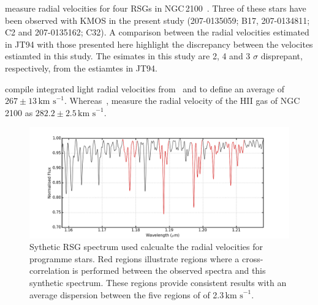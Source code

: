 \documentclass[useAMS,usenatbib]{mn2e}
\def\kms{$\mbox{km s}^{-1}$}
\begin{document}
\cite{1994A&A...282..717J} measure radial velocities for four RSGs in NGC\,2100~\citep[B17, C2, C32 and C34 using the nomenclature of][]{1974A&AS...15..261R}.
Three of these stars have been observed with KMOS in the present study (207-0135059; B17, 207-0134811; C2 and 207-0135162; C32).
A comparison between the radial velocities estimated in JT94 with those presented here highlight the discrepancy between the velocites estiamted in this study.
The esimates in this study are 2, 4 and 3 $\sigma$ disprepant, respectively, from the estiamtes in JT94.



\cite{1983ApJ...272..488F} compile integrated light radial velocities from~\cite{1972MNRAS.159..445A} and \cite{1970PhD...........F} to define an average of $267\pm13\,$\kms.
Whereas~\cite{1971ApJ...169..271S}, measure the radial velocity of the HII gas of NGC\,2100 as $282.2\pm2.5\,$\kms.


\begin{figure}
 \includegraphics[width=18.0cm]{NGC2100-rv-regions}
 \caption{Sythetic RSG spectrum used calcualte the radial velocities for programme stars.
 Red regions illustrate regions where a cross-correlation is performed between the observed spectra and this synthetic spectrum.
 These regions provide consistent results with an average dispersion between the five regions of of 2.3\,\kms.
\label{fig:rv-regions}
          }
\end{figure}
\end{document}
